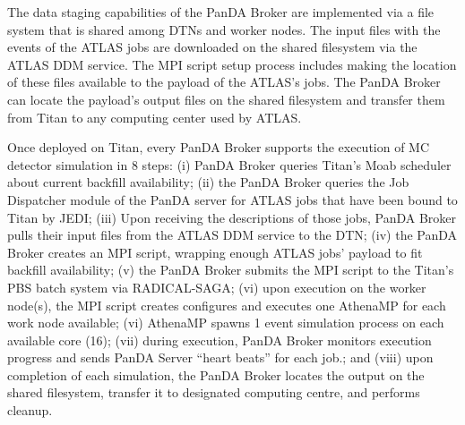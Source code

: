 The data staging capabilities of the PanDA Broker are implemented via a file
system that is shared among DTNs and worker nodes. The input files with the
events of the ATLAS jobs are downloaded on the shared filesystem via the ATLAS
DDM service. The MPI script setup process includes making the location of these
files available to the payload of the ATLAS's jobs. The PanDA Broker can locate
the payload's output files on the shared filesystem and transfer them from Titan
to any computing center used by ATLAS.

Once deployed on Titan, every PanDA Broker supports the execution of MC detector
simulation in 8 steps: (i) PanDA Broker queries Titan's Moab scheduler about
current backfill availability; (ii) the PanDA Broker queries the Job Dispatcher
module of the PanDA server for ATLAS jobs that have been bound to Titan by JEDI;
(iii) Upon receiving the descriptions of those jobs, PanDA Broker pulls their
input files from the ATLAS DDM service to the DTN; (iv) the PanDA Broker creates
an MPI script, wrapping enough ATLAS jobs' payload to fit backfill availability;
(v) the PanDA Broker submits the MPI script to the Titan's PBS batch system via
RADICAL-SAGA; (vi) upon execution on the worker node(s), the MPI script creates
configures and executes one AthenaMP for each work node available; (vi) AthenaMP
spawns 1 event simulation process on each available core (16); (vii) during
execution, PanDA Broker monitors execution progress and sends PanDA Server
``heart beats'' for each job.; and (viii) upon completion of each simulation,
the PanDA Broker locates the output on the shared filesystem, transfer it to
designated computing centre, and performs cleanup.




